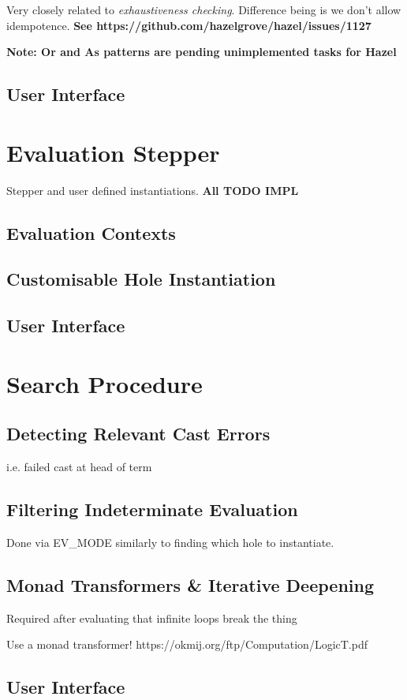 Very closely related to \textit{exhaustiveness checking}. Difference being is we don't allow idempotence. \textbf{See {https://github.com/hazelgrove/hazel/issues/1127}}

\textbf{Note: Or and As patterns are pending unimplemented tasks for Hazel}

\subsection{User Interface}\label{sec:UIIndetEval}


\section{Evaluation Stepper}\label{sec:Stepper}
Stepper and user defined instantiations. \textbf{All TODO IMPL}
\subsection{Evaluation Contexts}
\subsection{Customisable Hole Instantiation}
\subsection{User Interface}


\section{Search Procedure}\label{sec:SearchProcedure}
\subsection{Detecting Relevant Cast Errors}
i.e. failed cast at head of term
\subsection{Filtering Indeterminate Evaluation}
Done via EV\_MODE similarly to finding which hole to instantiate.

\subsection{Monad Transformers \& Iterative Deepening}\label{sec:IterativeDeepening}
Required after evaluating that infinite loops break the thing

Use a monad transformer! https://okmij.org/ftp/Computation/LogicT.pdf
\subsection{User Interface}


